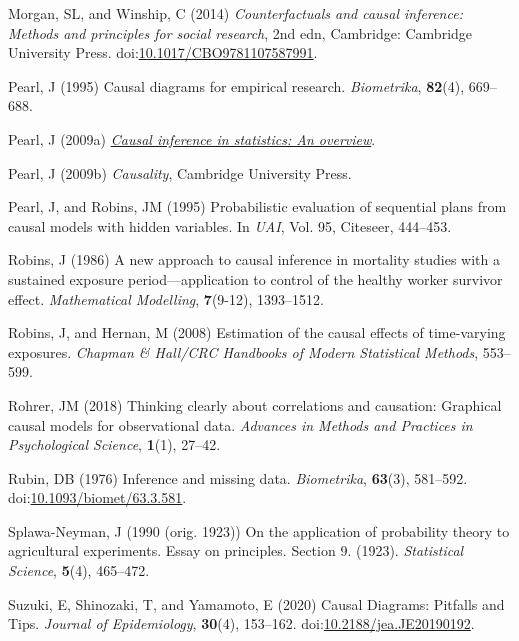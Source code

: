 \documentclass[
  singlecolumn]{article}
\newlength{\cslhangindent}
\newenvironment{CSLReferences}[2] %
 {\begin{list}{}{%
  \setlength{\itemindent}{0pt}
  \setlength{\leftmargin}{0pt}
  \setlength{\parsep}{0pt}
  \ifodd #1
   \setlength{\leftmargin}{\cslhangindent}
   \setlength{\itemindent}{-1\cslhangindent}
  \fi
  \setlength{\itemsep}{#2\baselineskip}}}
 {\end{list}}
\begin{document}
\begin{CSLReferences}{1}{0}
Morgan, SL, and Winship, C (2014) \emph{Counterfactuals and causal
inference: Methods and principles for social research}, 2nd edn,
Cambridge: Cambridge University Press.
doi:\href{https://doi.org/10.1017/CBO9781107587991}{10.1017/CBO9781107587991}.

Pearl, J (1995) Causal diagrams for empirical research.
\emph{Biometrika}, \textbf{82}(4), 669--688.

Pearl, J (2009a) \emph{\href{https://doi.org/10.1214/09-SS057}{Causal
inference in statistics: An overview}}.

Pearl, J (2009b) \emph{Causality}, Cambridge University Press.

Pearl, J, and Robins, JM (1995) Probabilistic evaluation of sequential
plans from causal models with hidden variables. In \emph{UAI}, Vol. 95,
Citeseer, 444--453.

Robins, J (1986) A new approach to causal inference in mortality studies
with a sustained exposure period---application to control of the healthy
worker survivor effect. \emph{Mathematical Modelling}, \textbf{7}(9-12),
1393--1512.

Robins, J, and Hernan, M (2008) Estimation of the causal effects of
time-varying exposures. \emph{Chapman \& Hall/CRC Handbooks of Modern
Statistical Methods}, 553--599.

Rohrer, JM (2018) Thinking clearly about correlations and causation:
Graphical causal models for observational data. \emph{Advances in
Methods and Practices in Psychological Science}, \textbf{1}(1), 27--42.

Rubin, DB (1976) Inference and missing data. \emph{Biometrika},
\textbf{63}(3), 581--592.
doi:\href{https://doi.org/10.1093/biomet/63.3.581}{10.1093/biomet/63.3.581}.

Splawa-Neyman, J (1990 (orig. 1923)) On the application of probability
theory to agricultural experiments. Essay on principles. Section 9.
(1923). \emph{Statistical Science}, \textbf{5}(4), 465--472.

Suzuki, E, Shinozaki, T, and Yamamoto, E (2020) Causal Diagrams:
Pitfalls and Tips. \emph{Journal of Epidemiology}, \textbf{30}(4),
153--162.
doi:\href{https://doi.org/10.2188/jea.JE20190192}{10.2188/jea.JE20190192}.


\end{CSLReferences}
\end{document}
